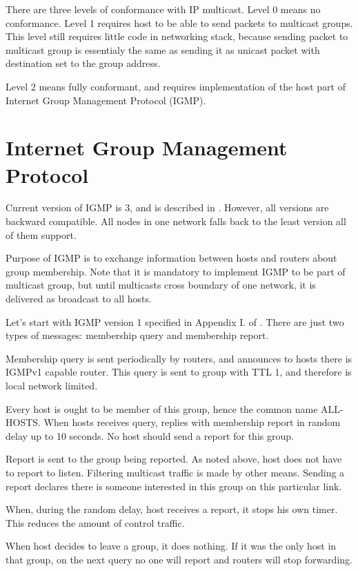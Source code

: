 There are three levels of conformance with IP multicast. Level 0 means no
conformance. Level 1 requires host to be able to send packets to multicast
groups. This level still requires little code in networking stack, because
sending packet to multicast group is essentialy the same as sending it as
unicast packet with destination set to the group address.

Level 2 means fully conformant, and requires implementation of the host part of
Internet Group Management Protocol (IGMP).

\section{Internet Group Management Protocol}

Current version of IGMP is 3, and is described in . However, all
versions are backward compatible. All nodes in one network falls back to the
least version all of them support.

Purpose of IGMP is to exchange information between hosts and routers about
group membership. Note that it is mandatory to implement IGMP to be part of
multicast group, but until multicasts cross boundary of one network, it is
delivered as broadcast to all hosts.

Let's start with IGMP version 1 specified in Appendix I. of . There
are just two types of messages: membership query and membership report.

Membership query is sent periodically by routers, and announces to hosts there
is IGMPv1 capable router. This query is sent to group  with TTL 1, and
therefore is local network limited.

Every host is ought to be member of this group, hence the common name
ALL-HOSTS. When hosts receives query, replies with membership report in random
delay up to 10 seconds. No host should send a report for this group.

Report is sent to the group being reported. As noted above, host does not have
to report to listen. Filtering multicast traffic is made by other means.
Sending a report declares there is someone interested in this group on this
particular link.

When, during the random delay, host receives a report, it stops his own timer.
This reduces the amount of control traffic.

When host decides to leave a group, it does nothing. If it was the only host in
that group, on the next query no one will report and routers will stop
forwarding.


